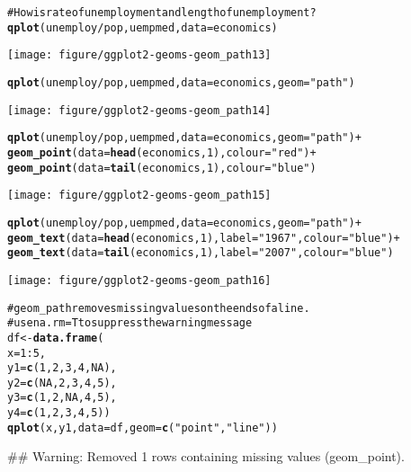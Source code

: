 \documentclass[a4paper,titlepage]{tufte-handout}\usepackage{graphicx, color}
\makeatletter
\def\maxwidth{ %
  \ifdim\Gin@nat@width>\linewidth
    \linewidth
  \else
    \Gin@nat@width
  \fi
}
\newcommand{\hlfunctioncall}[1]{\textcolor[rgb]{0.501960784313725,0,0.329411764705882}{\textbf{#1}}}%
\newcommand{\hlstring}[1]{\textcolor[rgb]{0.6,0.6,1}{#1}}%
\newcommand{\hlcomment}[1]{\textcolor[rgb]{0.180392156862745,0.6,0.341176470588235}{#1}}%
\newenvironment{kframe}{%
 \def\at@end@of@kframe{}%
 \ifinner\ifhmode%
  \def\at@end@of@kframe{\end{minipage}}%
  \begin{minipage}{\columnwidth}%
 \fi\fi%
 \def\FrameCommand##1{\hskip\@totalleftmargin \hskip-\fboxsep
 \colorbox{shadecolor}{##1}\hskip-\fboxsep
     \hskip-\linewidth \hskip-\@totalleftmargin \hskip\columnwidth}%
 \MakeFramed {\advance\hsize-\width
   \@totalleftmargin\z@ \linewidth\hsize
   \@setminipage}}%
 {\par\unskip\endMakeFramed%
 \at@end@of@kframe}
\newenvironment{knitrout}{}{} %
\makeatother
\begin{document}
\begin{knitrout}
\begin{kframe}
\begin{alltt}
\hlcomment{# How is rate of unemployment and length of unemployment?}
\hlfunctioncall{qplot}(unemploy/pop, uempmed, data=economics)
\end{alltt}
\end{kframe}\texttt{[image: figure/ggplot2-geoms-geom\_path13]} \begin{kframe}\begin{alltt}
\hlfunctioncall{qplot}(unemploy/pop, uempmed, data=economics, geom=\hlstring{"path"})
\end{alltt}
\end{kframe}\texttt{[image: figure/ggplot2-geoms-geom\_path14]} \begin{kframe}\begin{alltt}
\hlfunctioncall{qplot}(unemploy/pop, uempmed, data=economics, geom=\hlstring{"path"}) +
  \hlfunctioncall{geom_point}(data=\hlfunctioncall{head}(economics, 1), colour=\hlstring{"red"}) +
  \hlfunctioncall{geom_point}(data=\hlfunctioncall{tail}(economics, 1), colour=\hlstring{"blue"})
\end{alltt}
\end{kframe}\texttt{[image: figure/ggplot2-geoms-geom\_path15]} \begin{kframe}\begin{alltt}
\hlfunctioncall{qplot}(unemploy/pop, uempmed, data=economics, geom=\hlstring{"path"}) +
  \hlfunctioncall{geom_text}(data=\hlfunctioncall{head}(economics, 1), label=\hlstring{"1967"}, colour=\hlstring{"blue"}) +
  \hlfunctioncall{geom_text}(data=\hlfunctioncall{tail}(economics, 1), label=\hlstring{"2007"}, colour=\hlstring{"blue"})
\end{alltt}
\end{kframe}\texttt{[image: figure/ggplot2-geoms-geom\_path16]} \begin{kframe}\begin{alltt}
\hlcomment{# geom_path removes missing values on the ends of a line.}
\hlcomment{# use na.rm = T to suppress the warning message}
df <- \hlfunctioncall{data.frame}(
  x = 1:5,
  y1 = \hlfunctioncall{c}(1, 2, 3, 4, NA),
  y2 = \hlfunctioncall{c}(NA, 2, 3, 4, 5),
  y3 = \hlfunctioncall{c}(1, 2, NA, 4, 5),
  y4 = \hlfunctioncall{c}(1, 2, 3, 4, 5))
\hlfunctioncall{qplot}(x, y1, data = df, geom = \hlfunctioncall{c}(\hlstring{"point"},\hlstring{"line"}))
\end{alltt}


{\ttfamily\noindent\textcolor{warningcolor}{\#\# Warning: Removed 1 rows containing missing values (geom\_point).}}


\end{kframe}
\end{knitrout}
\end{document}
